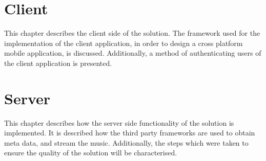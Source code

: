 



\chapter{Client}

This chapter describes the client side of the solution. The framework
used for the implementation of the client application, in order to
design a cross platform mobile application, is
discussed. Additionally, a method of authenticating users of the
client application is presented.



\chapter{Server}

This chapter describes how the server side functionality of the solution is implemented. It is described how the third party frameworks are used to obtain meta data, and stream the music. Additionally, the steps which were taken to ensure the quality of the solution will be characterised.














